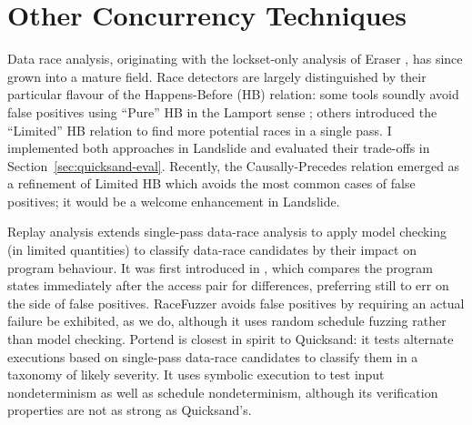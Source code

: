 \section{Other Concurrency Techniques}

Data race analysis, originating with the lockset-only analysis of Eraser \cite{eraser},
has since grown into a mature field.
Race detectors are largely distinguished by their particular flavour of the Happens-Before (HB) relation:
some tools \cite{fasttrack,djit} soundly avoid false positives using ``Pure'' HB in the Lamport sense \cite{lamport-clocks};
others \cite{tsan,hybriddatarace} introduced the ``Limited'' HB relation to find more potential races in a single pass.
I implemented both approaches in Landslide and evaluated their trade-offs in Section~\ref{sec:quicksand-eval}.
%
Recently, the Causally-Precedes relation \cite{predictive-dr} emerged as a refinement of Limited HB which avoids the most common cases of false positives; it would be a welcome enhancement in Landslide.

Replay analysis extends single-pass data-race analysis to apply model checking (in limited quantities) to classify data-race candidates by their impact on program behaviour.
It was first introduced in \cite{recordreplaydrs}, which compares the program states immediately after the access pair for differences, preferring still to err on the side of false positives.
RaceFuzzer \cite{racefuzzer} avoids false positives by requiring an actual failure be exhibited, as we do,
although it uses random schedule fuzzing rather than model checking.
%
Portend \cite{portend} is closest in spirit to Quicksand:
it tests alternate executions based on single-pass data-race candidates to classify them in a taxonomy of likely severity.
It uses symbolic execution to test input nondeterminism as well as schedule nondeterminism,
although its verification properties are not as strong as Quicksand's.


